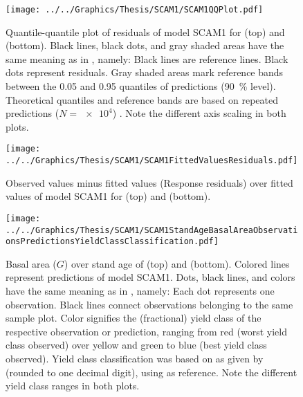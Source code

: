 \begin{figure}[h]
  \centering
  \texttt{[image: ../../Graphics/Thesis/SCAM1/SCAM1QQPlot.pdf]}
  \caption{Quantile-quantile plot of residuals of model SCAM1 for \Beech{} (top) and \Spruce{} (bottom).  Black lines, black dots, and gray shaded areas have the same meaning as in , namely:  Black lines are reference lines.  Black dots represent residuals.  Gray shaded areas mark reference bands between the \num{0.05} and \num{0.95} quantiles of predictions (\SI{90}{\percent} level).  Theoretical quantiles and reference bands are based on repeated predictions (\(N = \num{e4}\)) \parencite{Augustin2012}.  Note the different axis scaling in both plots.}
  \label{fig:SCAM1QQPlot}
\end{figure}

\begin{figure}[h]
  \centering
  \texttt{[image: ../../Graphics/Thesis/SCAM1/SCAM1FittedValuesResiduals.pdf]}
  \caption{Observed values minus fitted values (Response residuals) over fitted values of model SCAM1 for \Beech{} (top) and \Spruce{} (bottom).}
  \label{fig:SCAM1FittedValuesResiduals}
\end{figure}

\begin{figure}[h]
  \centering
  \texttt{[image: ../../Graphics/Thesis/SCAM1/SCAM1StandAgeBasalAreaObservationsPredictionsYieldClassClassification.pdf]}
  \caption{Basal area (\(G\)) over stand age of \Beech{} (top) and \Spruce{} (bottom).  Colored lines represent predictions of model SCAM1.  Dots, black lines, and colors have the same meaning as in , namely:  Each dot represents one observation.  Black lines connect observations belonging to the same sample plot.  Color signifies the (fractional) yield class of the respective observation or prediction, ranging from red (worst yield class observed) over yellow and green to blue (best yield class observed).  Yield class classification was based on \ProductivityIndexText{} as given by  (rounded to one decimal digit), using  as reference.  Note the different yield class ranges in both plots.}
  \label{fig:SCAM1StandAgeBasalAreaObservationsPredictionsYieldClassClassification}
\end{figure}

